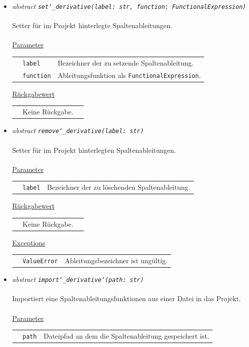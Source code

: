 \documentclass{article}
\begin{document}
\begin{itemize}
\item \textit{\flqq{}abstract\frqq} \texttt{\textit{set\char`_derivative(label: str, function: FunctionalExpression)}}\\\\
Setter für im Projekt hinterlegte Spaltenableitungen.
\\\\
\underline{Parameter}\\
\begin{tabular}{lll}
 & \texttt{label} & Bezeichner der zu setzende Spaltenableitung.\\
 & \texttt{function} & Ableitungsfunktion als \texttt{FunctionalExpression}.\\
\end{tabular}

\underline{Rückgabewert}\\
\begin{tabular}{lll}
 & Keine Rückgabe.\\
\end{tabular}


\item \textit{\flqq{}abstract\frqq} \texttt{\textit{remove\char`_derivative(label: str)}}\\\\
Setter für im Projekt hinterlegten Spaltenableitungen.
\\\\
\underline{Parameter}\\
\begin{tabular}{lll}
 & \texttt{label} & Bezeichner der zu löschenden Spaltenableitung.\\
\end{tabular}

\underline{Rückgabewert}\\
\begin{tabular}{lll}
 & Keine Rückgabe.\\
\end{tabular}

\underline{Exceptions}\\
\begin{tabular}{lll}
 & \texttt{ValueError} & Ableitungsbezeichner ist ungültig.\\
\end{tabular}


\item \textit{\flqq{}abstract\frqq} \texttt{\textit{import\char`_derivative\char`(path: str)}}\\\\
Importiert eine Spaltenableitungsfunktionen aus einer Datei in das Projekt.
\\\\
\underline{Parameter}\\
\begin{tabular}{lll}
 & \texttt{path} & Dateipfad an dem die Spaltenableitung gespeichert ist.\\
\end{tabular}


\end{itemize}
\end{document}
